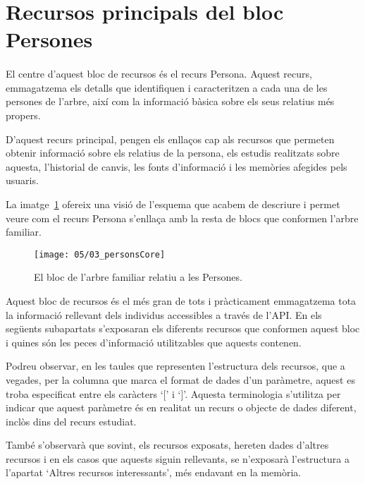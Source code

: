 \section{Recursos principals del bloc Persones}\label{sec:persons}

    \paragraph{}
    El centre d'aquest bloc de recursos és el recurs Persona. Aquest recurs, emmagatzema els detalls que identifiquen i caracteritzen a cada una de les persones de l'arbre, així com la informació bàsica sobre els seus relatius més propers.

    D'aquest recurs principal, pengen els enllaços cap als recursos que permeten obtenir informació sobre els relatius de la persona, els estudis realitzats sobre aquesta, l'historial de canvis, les fonts d'informació i les memòries afegides pels usuaris.

    La imatge~\ref{img:personsBloc} ofereix una visió de l'esquema que acabem de descriure i permet veure com el recurs Persona s'enllaça amb la resta de blocs que conformen l'arbre familiar.

    \begin{figure}[h]
        \texttt{[image: 05/03\_personsCore]}
        \centering
        \caption{El bloc de l'arbre familiar relatiu a les Persones.}\label{img:personsBloc}
    \end{figure}

    Aquest bloc de recursos és el més gran de tots i pràcticament emmagatzema tota la informació rellevant dels individus accessibles a través de l'API. En els següents subapartats s'exposaran els diferents recursos que conformen aquest bloc i quines són les peces d'informació utilitzables que aquests contenen.

    Podreu observar, en les taules que representen l'estructura dels recursos, que a vegades, per la columna que marca el format de dades d'un paràmetre, aquest es troba especificat entre els caràcters `[' i `]'. Aquesta terminologia s'utilitza per indicar que aquest paràmetre és en realitat un recurs o objecte de dades diferent, inclòs dins del recurs estudiat.

    També s'observarà que sovint, els recursos exposats, hereten dades d'altres recursos i en els casos que aquests siguin rellevants, se n'exposarà l'estructura a l'apartat `Altres recursos interessants', més endavant en la memòria.

    
    
    
    
    
    
    
    
    
